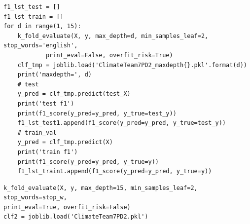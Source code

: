 \documentclass{article} %
\begin{document}
\lstset{language=Python}
\lstset{frame=lines}
\lstset{basicstyle=\footnotesize}
\begin{lstlisting}
f1_lst_test = []
f1_lst_train = []
for d in range(1, 15):
	k_fold_evaluate(X, y, max_depth=d, min_samples_leaf=2, stop_words='english', 
			print_eval=False, overfit_risk=True)
	clf_tmp = joblib.load('ClimateTeam7PD2_maxdepth{}.pkl'.format(d))
	print('maxdepth=', d)
	# test
	y_pred = clf_tmp.predict(test_X)
	print('test f1')
	print(f1_score(y_pred=y_pred, y_true=test_y))
	f1_lst_test1.append(f1_score(y_pred=y_pred, y_true=test_y))
	# train_val
	y_pred = clf_tmp.predict(X)
	print('train f1')
	print(f1_score(y_pred=y_pred, y_true=y))
	f1_lst_train1.append(f1_score(y_pred=y_pred, y_true=y))
\end{lstlisting}

\lstset{language=Python}
\lstset{frame=lines}
\lstset{basicstyle=\footnotesize}
\begin{lstlisting}
k_fold_evaluate(X, y, max_depth=15, min_samples_leaf=2, 
stop_words=stop_w, 
print_eval=True, overfit_risk=False)
clf2 = joblib.load('ClimateTeam7PD2.pkl')
\end{lstlisting}





\end{document}
